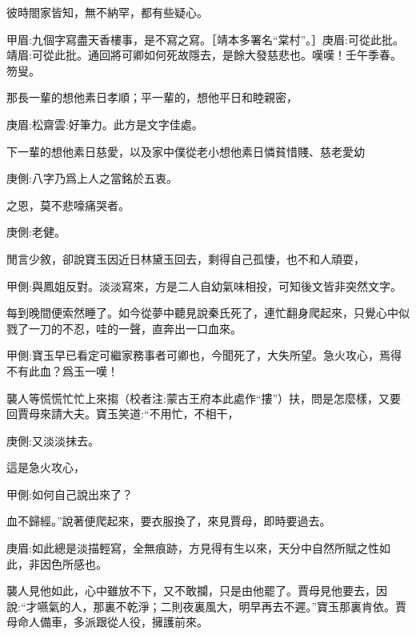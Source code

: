 \begin{parag}
    彼時閤家皆知，無不納罕，都有些疑心。\begin{note}甲眉:九個字寫盡天香樓事，是不寫之寫。［靖本多署名“棠村”。］庚眉:可從此批。靖眉:可從此批。通回將可卿如何死故隱去，是餘大發慈悲也。嘆嘆！壬午季春。 笏叟。\end{note}那長一輩的想他素日孝順；平一輩的，想他平日和睦親密，\begin{note}庚眉:松齋雲:好筆力。此方是文字佳處。\end{note}下一輩的想他素日慈愛，以及家中僕從老小想他素日憐貧惜賤、慈老愛幼\begin{note}庚側:八字乃爲上人之當銘於五衷。\end{note}之恩，莫不悲嚎痛哭者。\begin{note}庚側:老健。\end{note}
\end{parag}


\begin{parag}
    閒言少敘，卻說寶玉因近日林黛玉回去，剩得自己孤悽，也不和人頑耍，\begin{note}甲側:與鳳姐反對。淡淡寫來，方是二人自幼氣味相投，可知後文皆非突然文字。\end{note}每到晚間便索然睡了。如今從夢中聽見說秦氏死了，連忙翻身爬起來，只覺心中似戮了一刀的不忍，哇的一聲，直奔出一口血來。\begin{note}甲側:寶玉早已看定可繼家務事者可卿也，今聞死了，大失所望。急火攻心，焉得不有此血？爲玉一嘆！\end{note}襲人等慌慌忙忙上來搊（校者注:蒙古王府本此處作“摟”）扶，問是怎麼樣，又要回賈母來請大夫。寶玉笑道:“不用忙，不相干，\begin{note}庚側:又淡淡抹去。\end{note}這是急火攻心，\begin{note}甲側:如何自己說出來了？\end{note}血不歸經。”說著便爬起來，要衣服換了，來見賈母，即時要過去。\begin{note}庚眉:如此總是淡描輕寫，全無痕跡，方見得有生以來，天分中自然所賦之性如此，非因色所感也。\end{note}襲人見他如此，心中雖放不下，又不敢攔，只是由他罷了。賈母見他要去，因說:“才嚥氣的人，那裏不乾淨；二則夜裏風大，明早再去不遲。”寶玉那裏肯依。賈母命人備車，多派跟從人役，擁護前來。
\end{parag}


